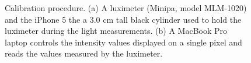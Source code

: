 \begin{figure}[!hbt]
	\centering
	
	\caption[Calibration procedure]{Calibration procedure. (a) A luximeter (Minipa, model MLM-1020) and the iPhone 5 the a 3.0 cm tall black cylinder used to hold the luximeter during the light measurements. (b) A MacBook Pro laptop controls the intensity values displayed on a single pixel and reads the values measured by the luximeter.  }
	\label{fig:luximeter}
\end{figure}




